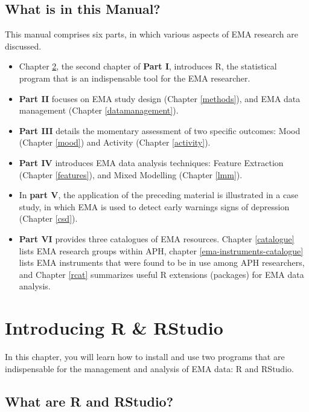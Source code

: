 \documentclass[]{book}
\begin{document}
\section{What is in this Manual?}\label{what-is-in-this-manual}

This manual comprises six parts, in which various aspects of EMA
research are discussed.

\begin{itemize}
\item
  Chapter \ref{rstudio}, the second chapter of \textbf{Part I},
  introduces R, the statistical program that is an indispensable tool
  for the EMA researcher.
\item
  \textbf{Part II} focuses on EMA study design (Chapter \ref{methods}),
  and EMA data management (Chapter \ref{datamanagement}).
\item
  \textbf{Part III} details the momentary assessment of two specific
  outcomes: Mood (Chapter \ref{mood}) and Activity (Chapter
  \ref{activity}).
\item
  \textbf{Part IV} introduces EMA data analysis techniques: Feature
  Extraction (Chapter \ref{features}), and Mixed Modelling (Chapter
  \ref{lmm}).
\item
  In \textbf{part V}, the application of the preceding material is
  illustrated in a case study, in which EMA is used to detect early
  warnings signs of depression (Chapter \ref{csd}).
\item
  \textbf{Part VI} provides three catalogues of EMA resources. Chapter
  \ref{catalogue} lists EMA research groups within APH, chapter
  \ref{ema-instruments-catalogue} lists EMA instruments that were found
  to be in use among APH researchers, and Chapter \ref{rcat} summarizes
  useful R extensions (packages) for EMA data analysis.
\end{itemize}

\chapter{Introducing R \& RStudio}\label{rstudio}


In this chapter, you will learn how to install and use two programs that
are indispensable for the management and analysis of EMA data: R and
RStudio.

\section{What are R and RStudio?}\label{what-are-r-and-rstudio}
\end{document}
